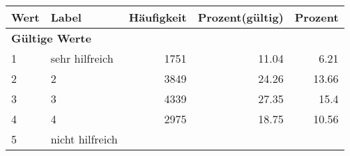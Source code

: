     \begin{longtable}{lXrrr}
     \toprule
     \textbf{Wert} & \textbf{Label} & \textbf{Häufigkeit} & \textbf{Prozent(gültig)} & \textbf{Prozent} \\
     \endhead
     \midrule
     \multicolumn{5}{l}{\textbf{Gültige Werte}}\\

     1 &
     \multicolumn{1}{X}{ sehr hilfreich   } &


       \num{1751} &
       \num[round-mode=places,round-precision=2]{11,04} &
         \num[round-mode=places,round-precision=2]{6,21} \\

     2 &
     \multicolumn{1}{X}{ 2   } &


       \num{3849} &
       \num[round-mode=places,round-precision=2]{24,26} &
         \num[round-mode=places,round-precision=2]{13,66} \\

     3 &
     \multicolumn{1}{X}{ 3   } &


       \num{4339} &
       \num[round-mode=places,round-precision=2]{27,35} &
         \num[round-mode=places,round-precision=2]{15,4} \\

     4 &
     \multicolumn{1}{X}{ 4   } &


       \num{2975} &
       \num[round-mode=places,round-precision=2]{18,75} &
         \num[round-mode=places,round-precision=2]{10,56} \\

     5 &
     \multicolumn{1}{X}{ nicht hilfreich   } &



\end{longtable}

